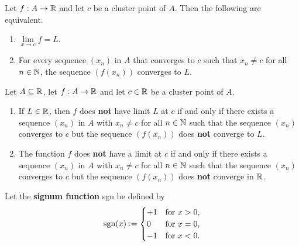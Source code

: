 \begin{theorem}
	Let $f:A \rightarrow \mathbb{R}$ and let $c$ be a cluster point of $A$. Then the following are equivalent.
	\begin{enumerate}
		\item $\lim\limits_{x\to c} f=L$.
		\item For every sequence $(x_n)$ in $A$ that converges to $c$ such that $x_n\neq c$ for all $n \in \mathbb{N}$, the sequence $(f(x_n))$ converges to $L$.
	\end{enumerate}
\end{theorem}

\begin{theorem}
	Let $A \subseteq \mathbb{R}$, let $f:A \rightarrow \mathbb{R}$ and let $c \in \mathbb{R}$ be a cluster point of $A$.
	\begin{enumerate}
		\item If $L \in \mathbb{R}$, then $f$ does \textbf{not} have limit $L$ at $c$ if and only if there exists a sequence $(x_n)$ in $A$ with $x_n \neq c$ for all $n \in \mathbb{N}$ such that the sequence $(x_n)$ converges to $c$ but the sequence $(f(x_n))$ does \textbf{not} converge to $L$.

		\item The function $f$ does \textbf{not} have a limit at $c$ if and only if there exists a sequence $(x_n)$ in $A$ with $x_n \neq c$ for all $n \in \mathbb{N}$ such that the sequence $(x_n)$ converges to $c$ but the sequence $(f(x_n))$ does \textbf{not} converge in $\mathbb{R}$.
	\end{enumerate}
\end{theorem}

Let the \textbf{signum function} sgn be defined by
\[\operatorname{sgn} (x):=\begin{cases}
		+1 & \text{for }  x>0,   \\
		0  & \text{for }  x=0,   \\
		-1 & \text{for }  x < 0.
	\end{cases}\]
